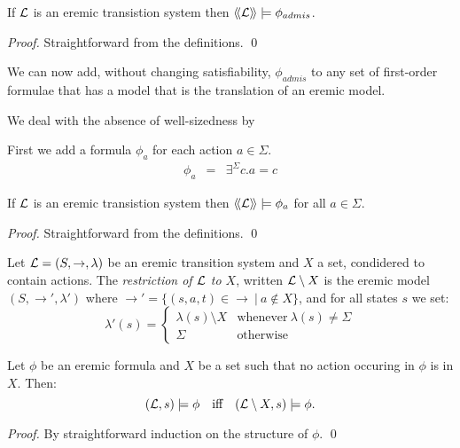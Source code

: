 \begin{lemma}\label{compactness:lemma:233}
If $\mathcal{L}$ is an eremic transistion system then $\langle\!\langle \mathcal{L} \rangle\!\rangle \models
\phi_{admis}$.
\end{lemma}

\begin{proof}
Straightforward from the definitions.
\qed
\end{proof}

\NI We can now add, without changing satisfiability, $\phi_{admis}$ to
any set of first-order formulae that has a model that is the
translation of an eremic model.

We deal with the absence of well-sizedness by 

First we add a formula $\phi_a$ for each action $a \in \Sigma$.
\begin{eqnarray*}
   \phi_{a} 
      & = &
   \exists^{\Sigma} c. a = c 
\end{eqnarray*}

\begin{lemma}\label{compactness:lemma:666}
If $\mathcal{L}$ is an eremic transistion system then $\langle\!\langle \mathcal{L} \rangle\!\rangle \models
\phi_{a}$ for all $a \in \Sigma$.
\end{lemma}

\begin{proof}
Straightforward from the definitions.
\qed
\end{proof}

\begin{definition}
Let $\mathcal{L} = (S, \rightarrow, \lambda)$ be an eremic transition system
and $X$ a set, condidered to contain actions. The \emph{restriction of
  $\mathcal{L}$ to $X$}, written $\mathcal{L} \setminus X$ is the eremic model $(S,
\rightarrow', \lambda')$ where $\rightarrow' = \{(s, a, t) \in
\rightarrow \ |\ a \notin X\}$, and for all states $s$ we set:
\[
   \lambda'(s) 
        =
   \begin{cases}
       \lambda(s) \setminus  X & \text{whenever}\ \lambda(s) \neq \Sigma \\
       \Sigma & \text{otherwise}
   \end{cases}
\]

\end{definition}

\begin{lemma}\label{compactness:lemma:1717}
Let $\phi$ be an eremic formula and $X$ be a set such that no action
occuring in $\phi$ is in $X$. Then:
\[
   (\mathcal{L}, s) \models \phi
      \quad\text{iff}\quad
   (\mathcal{L} \setminus X, s) \models \phi.
\]
\end{lemma}
\begin{proof}
By straightforward induction on the structure of $\phi$.
\qed
\end{proof}

